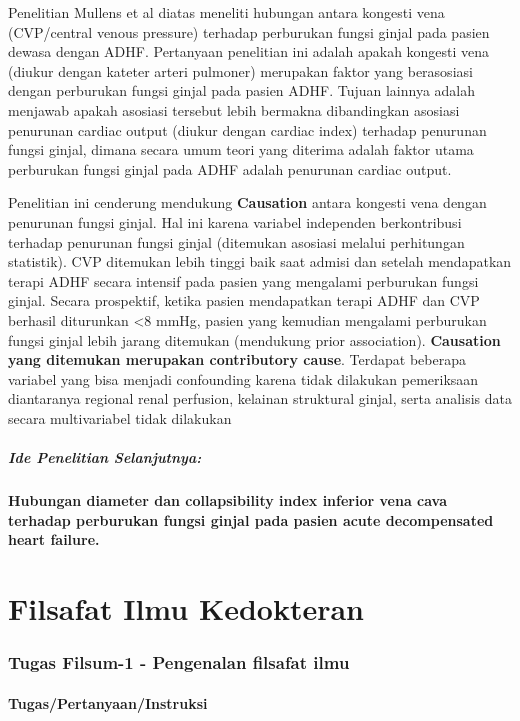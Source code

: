\documentclass[
  letterpaper,
  DIV=11,
  numbers=noendperiod]{scrreprt}
\let\oldparagraph\paragraph
\renewcommand{\paragraph}[1]{\oldparagraph{#1}\mbox{}}
\let\oldsubparagraph\subparagraph
\renewcommand{\subparagraph}[1]{\oldsubparagraph{#1}\mbox{}}
\begin{document}
Penelitian Mullens et al diatas meneliti hubungan antara kongesti vena
(CVP/central venous pressure) terhadap perburukan fungsi ginjal pada
pasien dewasa dengan ADHF. Pertanyaan penelitian ini adalah apakah
kongesti vena (diukur dengan kateter arteri pulmoner) merupakan faktor
yang berasosiasi dengan perburukan fungsi ginjal pada pasien ADHF.
Tujuan lainnya adalah menjawab apakah asosiasi tersebut lebih bermakna
dibandingkan asosiasi penurunan cardiac output (diukur dengan cardiac
index) terhadap penurunan fungsi ginjal, dimana secara umum teori yang
diterima adalah faktor utama perburukan fungsi ginjal pada ADHF adalah
penurunan cardiac output.

Penelitian ini cenderung mendukung \textbf{Causation} antara kongesti
vena dengan penurunan fungsi ginjal. Hal ini karena variabel independen
berkontribusi terhadap penurunan fungsi ginjal (ditemukan asosiasi
melalui perhitungan statistik). CVP ditemukan lebih tinggi baik saat
admisi dan setelah mendapatkan terapi ADHF secara intensif pada pasien
yang mengalami perburukan fungsi ginjal. Secara prospektif, ketika
pasien mendapatkan terapi ADHF dan CVP berhasil diturunkan \textless8
mmHg, pasien yang kemudian mengalami perburukan fungsi ginjal lebih
jarang ditemukan (mendukung prior association). \textbf{Causation yang
ditemukan merupakan contributory cause}. Terdapat beberapa variabel yang
bisa menjadi confounding karena tidak dilakukan pemeriksaan diantaranya
regional renal perfusion, kelainan struktural ginjal, serta analisis
data secara multivariabel tidak dilakukan

\subparagraph{Ide Penelitian
Selanjutnya:}\label{ide-penelitian-selanjutnya}

\textbf{Hubungan diameter dan collapsibility index inferior vena cava
terhadap perburukan fungsi ginjal pada pasien acute decompensated heart
failure.}

\section{Filsafat Ilmu Kedokteran}\label{filsafat-ilmu-kedokteran}

\subsubsection{Tugas Filsum-1 - Pengenalan filsafat
ilmu}\label{tugas-filsum-1---pengenalan-filsafat-ilmu}

\paragraph{Tugas/Pertanyaan/Instruksi}\label{tugaspertanyaaninstruksi-1}
\end{document}
